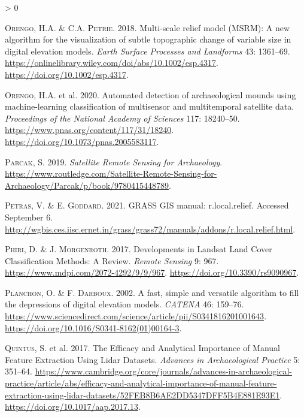 \documentclass[
  12pt,
]{article}
\newlength{\cslhangindent}
\newenvironment{CSLReferences}[2] %
 {%
  \setlength{\parindent}{0pt}
  \ifodd #1 \everypar{\setlength{\hangindent}{\cslhangindent}}\ignorespaces\fi
  \ifnum #2 > 0
  \setlength{\parskip}{#2\baselineskip}
  \fi
 }%
 {}
\begin{document}
\begin{CSLReferences}{1}{0}
\leavevmode\hypertarget{ref-orengoMultiscaleReliefModel2018a}{}%
\textsc{Orengo}, H.A. \& C.A. \textsc{Petrie}. 2018. Multi-scale relief model ({MSRM}): A new algorithm for the visualization of subtle topographic change of variable size in digital elevation models. \emph{Earth Surface Processes and Landforms} 43: 1361--69. \url{https://onlinelibrary.wiley.com/doi/abs/10.1002/esp.4317}. \url{https://doi.org/10.1002/esp.4317}.

\leavevmode\hypertarget{ref-orengoAutomatedDetectionArchaeological2020a}{}%
\textsc{Orengo}, H.A. et al. 2020. Automated detection of archaeological mounds using machine-learning classification of multisensor and multitemporal satellite data. \emph{Proceedings of the National Academy of Sciences} 117: 18240--50. \url{https://www.pnas.org/content/117/31/18240}. \url{https://doi.org/10.1073/pnas.2005583117}.

\leavevmode\hypertarget{ref-parcakSatelliteRemoteSensing2019}{}%
\textsc{Parcak}, S. 2019. \emph{Satellite {Remote} {Sensing} for {Archaeology}}. \url{https://www.routledge.com/Satellite-Remote-Sensing-for-Archaeology/Parcak/p/book/9780415448789}.

\leavevmode\hypertarget{ref-petrasGRASSGISManual}{}%
\textsc{Petras}, V. \& E. \textsc{Goddard}. 2021. {GRASS} {GIS} manual: r.local.relief. Accessed September 6. \url{http://wgbis.ces.iisc.ernet.in/grass/grass72/manuals/addons/r.local.relief.html}.

\leavevmode\hypertarget{ref-phiriDevelopmentsLandsatLand2017}{}%
\textsc{Phiri}, D. \& J. \textsc{Morgenroth}. 2017. Developments in {Landsat} {Land} {Cover} {Classification} {Methods}: {A} {Review}. \emph{Remote Sensing} 9: 967. \url{https://www.mdpi.com/2072-4292/9/9/967}. \url{https://doi.org/10.3390/rs9090967}.

\leavevmode\hypertarget{ref-planchonFastSimpleVersatile2002}{}%
\textsc{Planchon}, O. \& F. \textsc{Darboux}. 2002. A fast, simple and versatile algorithm to fill the depressions of digital elevation models. \emph{CATENA} 46: 159--76. \url{https://www.sciencedirect.com/science/article/pii/S0341816201001643}. \url{https://doi.org/10.1016/S0341-8162(01)00164-3}.

\leavevmode\hypertarget{ref-quintusEfficacyAnalyticalImportance2017}{}%
\textsc{Quintus}, S. et al. 2017. The {Efficacy} and {Analytical} {Importance} of {Manual} {Feature} {Extraction} {Using} {Lidar} {Datasets}. \emph{Advances in Archaeological Practice} 5: 351--64. \url{https://www.cambridge.org/core/journals/advances-in-archaeological-practice/article/abs/efficacy-and-analytical-importance-of-manual-feature-extraction-using-lidar-datasets/52FEB8B6AE2DD5347DFF5B4E881E93E1}. \url{https://doi.org/10.1017/aap.2017.13}.


\end{CSLReferences}
\end{document}
